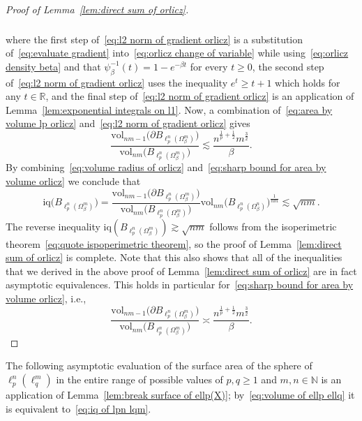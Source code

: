 \documentclass[11pt,reqno]{amsart}
\renewcommand{\ge}{\geqslant}
\newcommand{\R}{\mathbb R}
\theoremstyle{remark}
\newcommand{\iq}{\mathrm{iq}}
\newcommand{\N}{\mathbb N}
\newcommand{\vol}{\mathrm{vol}}
\renewcommand{\1}{\mathbf 1}
\begin{document}
\begin{proof}[Proof of Lemma~\ref{lem:direct sum of orlicz}]
\begin{align}
\begin{split}
\end{split}
\end{align}
where the first step of~\eqref{eq:l2 norm of gradient orlicz}  is a substitution of~\eqref{eq:evaluate gradient} into~\eqref{eq:orlicz change of variable} while using~\eqref{eq:orlicz density beta} and that $\psi_{\!\!\beta}^{-1}(t)=1-e^{-\beta t}$ for every $t\ge 0$, the second step of~\eqref{eq:l2 norm of gradient orlicz} uses the  inequality $e^t\ge t+1$ which holds for any $t\in \R$, and the final step of~\eqref{eq:l2 norm of gradient orlicz} is an application of Lemma~\ref{lem:exponential integrals on l1}. Now, a combination of~\eqref{eq:area by volume lp orlicz}  and~\eqref{eq:l2 norm of gradient orlicz} gives
\begin{equation}\label{eq:sharp bound for area by volume orlicz}
\frac{\vol_{nm-1}\big(\partial B_{\ell_p^n(\Omega_\beta^m)}\big)}{\vol_{nm}\big(B_{\ell_p^n(\Omega_\beta^m)}\big)}\lesssim \frac{n^{\frac{1}{p}+\frac12}m^{\frac32}}{\beta}.
\end{equation}
By combining~\eqref{eq:volume radius of orlicz} and~\eqref{eq:sharp bound for area by volume orlicz} we conclude that
$$
\iq\big(B_{\ell_p^n(\Omega^m_\beta)}\big)= \frac{\vol_{nm-1}\big(\partial B_{\ell_p^n(\Omega_\beta^m)}\big)}{\vol_{nm}\big(B_{\ell_p^n(\Omega_\beta^m)}\big)}\vol_{nm}\big(B_{\ell_p^n(\Omega_\beta^n)}\big)^{\frac{1}{nm}}\lesssim \sqrt{nm}.
$$
The reverse inequality $\iq(B_{\ell_p^n(\Omega^m_\beta)})\gtrsim \sqrt{nm}$ follows from the isoperimetric theorem~\eqref{eq:quote ispoperimetric theorem}, so the proof of Lemma~\ref{lem:direct sum of orlicz} is complete. Note that this also shows that all of the inequalities that we derived in the above proof of Lemma~\ref{lem:direct sum of orlicz} are in fact asymptotic equivalences. This holds in particular for~\eqref{eq:sharp bound for area by volume orlicz}, i.e.,
\begin{equation*}
\frac{\vol_{nm-1}\big(\partial B_{\ell_p^n(\Omega_\beta^m)}\big)}{\vol_{nm}\big(B_{\ell_p^n(\Omega_\beta^m)}\big)}\asymp \frac{n^{\frac{1}{p}+\frac12}m^{\frac32}}{\beta}.\tag*{\qedhere}
\end{equation*}
\end{proof}





The following asymptotic evaluation of the surface area of the sphere of $\ell_p^n(\ell_q^m)$ in the entire range of possible values of $p,q\ge 1$ and $m,n\in \N$ is an application of Lemma~\ref{lem:break surface of ellp(X)};  by~\eqref{eq:volume of ellp ellq} it is equivalent to~\eqref{eq:iq of lpn lqm}.
\end{document}
